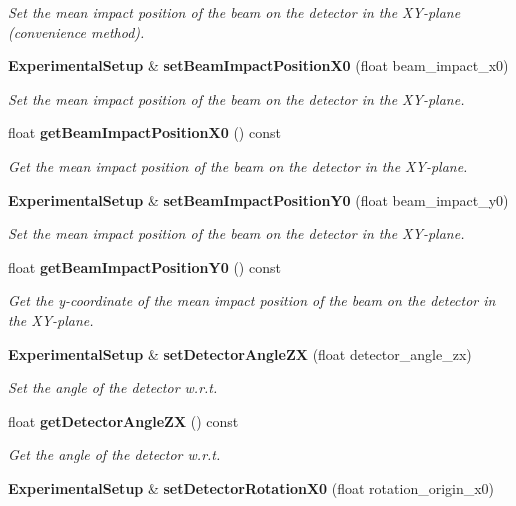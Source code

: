 \begin{DoxyCompactItemize}
\begin{DoxyCompactList}\small\item\em Set the mean impact position of the beam on the detector in the X\-Y-\/plane (convenience method). \end{DoxyCompactList}\item 
{\bf Experimental\-Setup} \& {\bf set\-Beam\-Impact\-Position\-X0} (float beam\-\_\-impact\-\_\-x0)\label{classCALICE_1_1ExperimentalSetup_a7384248835a18c483ff922426e372eab}

\begin{DoxyCompactList}\small\item\em Set the mean impact position of the beam on the detector in the X\-Y-\/plane. \end{DoxyCompactList}\item 
float {\bf get\-Beam\-Impact\-Position\-X0} () const \label{classCALICE_1_1ExperimentalSetup_a74f73b1fe7ccd42b48f3bc7834826a7b}

\begin{DoxyCompactList}\small\item\em Get the mean impact position of the beam on the detector in the X\-Y-\/plane. \end{DoxyCompactList}\item 
{\bf Experimental\-Setup} \& {\bf set\-Beam\-Impact\-Position\-Y0} (float beam\-\_\-impact\-\_\-y0)\label{classCALICE_1_1ExperimentalSetup_a6e4037224f3d8372ddbc4d5a76a8b12a}

\begin{DoxyCompactList}\small\item\em Set the mean impact position of the beam on the detector in the X\-Y-\/plane. \end{DoxyCompactList}\item 
float {\bf get\-Beam\-Impact\-Position\-Y0} () const \label{classCALICE_1_1ExperimentalSetup_adb19ccbf3411bf1824939323b71238c7}

\begin{DoxyCompactList}\small\item\em Get the y-\/coordinate of the mean impact position of the beam on the detector in the X\-Y-\/plane. \end{DoxyCompactList}\item 
{\bf Experimental\-Setup} \& {\bf set\-Detector\-Angle\-Z\-X} (float detector\-\_\-angle\-\_\-zx)
\begin{DoxyCompactList}\small\item\em Set the angle of the detector w.\-r.\-t. \end{DoxyCompactList}\item 
float {\bf get\-Detector\-Angle\-Z\-X} () const 
\begin{DoxyCompactList}\small\item\em Get the angle of the detector w.\-r.\-t. \end{DoxyCompactList}\item 
{\bf Experimental\-Setup} \& {\bf set\-Detector\-Rotation\-X0} (float rotation\-\_\-origin\-\_\-x0)\label{classCALICE_1_1ExperimentalSetup_a6f5c242f1cd5a9d626fac9e46193e7a6}


\end{DoxyCompactItemize}
